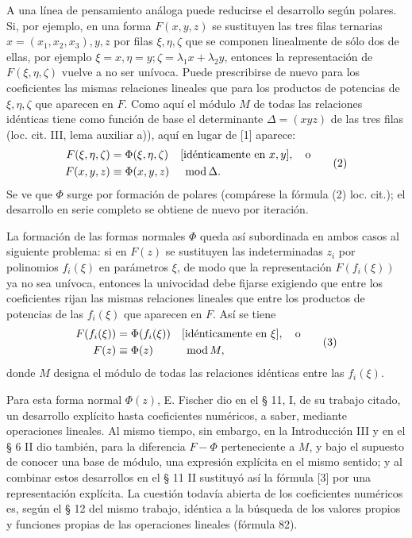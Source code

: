 \documentclass[11pt]{article}
\newcommand{\modu}[1]{\;\operatorname{mod} #1}
\begin{document}
A una línea de pensamiento análoga puede reducirse el desarrollo según polares. Si, por ejemplo, en una forma \(F(x,y,z)\) se sustituyen las tres filas ternarias \(x=(x_1,x_2,x_3),y,z\) por filas \(\xi,\eta,\zeta\) que se componen linealmente de sólo dos de ellas, por ejemplo \(\xi=x,\eta=y;\zeta=\lambda_1x+\lambda_2y\), entonces la representación de \(F(\xi,\eta,\zeta)\) vuelve a no ser unívoca. Puede prescribirse de nuevo para los coeficientes las mismas relaciones lineales que para los productos de potencias de \(\xi,\eta,\zeta\) que aparecen en \(F\). Como aquí el módulo \(M\) de todas las relaciones idénticas tiene como función de base el determinante \(\Delta=(xyz)\) de las tres filas (loc. cit. III, lema auxiliar a)), aquí en lugar de [1] aparece:
\begin{equation}
\begin{aligned}
        F(\xi,\eta,\zeta)&=\Phi(\xi,\eta,\zeta)&&[\text{idénticamente en }x,y],\quad\text{o}\notag\\
        F(x,y,z)&\equiv\Phi(x,y,z)&&\modu{\Delta}.
\end{aligned}
\tag{2}
\end{equation}
Se ve que \(\Phi\) surge por formación de polares (compárese la fórmula (2) loc. cit.); el desarrollo en serie completo se obtiene de nuevo por iteración.

La formación de las formas normales \(\Phi\) queda así subordinada en ambos casos al siguiente problema: si en \(F(z)\) se sustituyen las indeterminadas \(z_i\) por polinomios \(f_i(\xi)\) en parámetros \(\xi\), de modo que la representación \(F(f_i(\xi))\) ya no sea unívoca, entonces la univocidad debe fijarse exigiendo que entre los coeficientes rijan las mismas relaciones lineales que entre los productos de potencias de las \(f_i(\xi)\) que aparecen en \(F\). Así se tiene
\begin{equation}
\begin{aligned}
        F(f_i(\xi))&=\Phi(f_i(\xi))&&[\text{idénticamente en }\xi],\quad\text{o}\notag\\
        F(z)&\equiv\Phi(z)&&\modu{M},
\end{aligned}
\tag{3}
\end{equation}
donde \(M\) designa el módulo de todas las relaciones idénticas entre las \(f_i(\xi)\).

Para esta forma normal \(\Phi(z)\), E. Fischer dio en el § 11, I, de su trabajo citado, un desarrollo explícito hasta coeficientes numéricos, a saber, mediante operaciones lineales. Al mismo tiempo, sin embargo, en la Introducción III y en el § 6 II dio también, para la diferencia \(F-\Phi\) perteneciente a \(M\), y bajo el supuesto de conocer una base de módulo, una expresión explícita en el mismo sentido; y al combinar estos desarrollos en el § 11 II sustituyó así la fórmula [3] por una representación explícita. La cuestión todavía abierta de los coeficientes numéricos es, según el § 12 del mismo trabajo, idéntica a la búsqueda de los valores propios y funciones propias de las operaciones lineales (fórmula 82).
\end{document}
